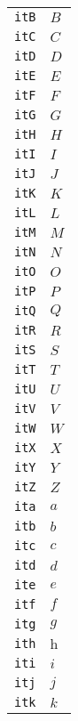 \begin{longtable}{ll}
\texttt{itB}&${}{\textit{B}}{}$\\
\texttt{itC}&${}{\textit{C}}{}$\\
\texttt{itD}&${}{\textit{D}}{}$\\
\texttt{itE}&${}{\textit{E}}{}$\\
\texttt{itF}&${}{\textit{F}}{}$\\
\texttt{itG}&${}{\textit{G}}{}$\\
\texttt{itH}&${}{\textit{H}}{}$\\
\texttt{itI}&${}{\textit{I}}{}$\\
\texttt{itJ}&${}{\textit{J}}{}$\\
\texttt{itK}&${}{\textit{K}}{}$\\
\texttt{itL}&${}{\textit{L}}{}$\\
\texttt{itM}&${}{\textit{M}}{}$\\
\texttt{itN}&${}{\textit{N}}{}$\\
\texttt{itO}&${}{\textit{O}}{}$\\
\texttt{itP}&${}{\textit{P}}{}$\\
\texttt{itQ}&${}{\textit{Q}}{}$\\
\texttt{itR}&${}{\textit{R}}{}$\\
\texttt{itS}&${}{\textit{S}}{}$\\
\texttt{itT}&${}{\textit{T}}{}$\\
\texttt{itU}&${}{\textit{U}}{}$\\
\texttt{itV}&${}{\textit{V}}{}$\\
\texttt{itW}&${}{\textit{W}}{}$\\
\texttt{itX}&${}{\textit{X}}{}$\\
\texttt{itY}&${}{\textit{Y}}{}$\\
\texttt{itZ}&${}{\textit{Z}}{}$\\
\texttt{ita}&${}{\textit{a}}{}$\\
\texttt{itb}&${}{\textit{b}}{}$\\
\texttt{itc}&${}{\textit{c}}{}$\\
\texttt{itd}&${}{\textit{d}}{}$\\
\texttt{ite}&${}{\textit{e}}{}$\\
\texttt{itf}&${}{\textit{f}}{}$\\
\texttt{itg}&${}{\textit{g}}{}$\\
\texttt{ith}&${}{\textit{h}}{}$\\
\texttt{iti}&${}{\textit{i}}{}$\\
\texttt{itj}&${}{\textit{j}}{}$\\
\texttt{itk}&${}{\textit{k}}{}$\\

\end{longtable}
